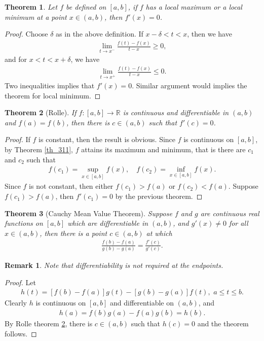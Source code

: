 \documentclass[10pt]{book}
\newtheorem{theorem}{Theorem}[chapter]
\newtheorem{remark}{Remark}[chapter]
\theoremstyle{definition}
\numberwithin{equation}{chapter}
\begin{document}
\begin{theorem}\label{th_45}
Let $f$ be defined on $[a,b]$, if $f$ has a local maximum or a local minimum at a point $x \in (a,b)$, then $f'(x) = 0$.
\end{theorem}
\begin{proof}
Choose $\delta$ as in the above definition. If $x - \delta < t < x$, then we have
\begin{align*}
    \lim_{t\to x^-}\frac{f(t) - f(x)}{t - x} \geq 0,
\end{align*}
and for $x < t < x + \delta$, we have
\begin{align*}
    \lim_{t\to x^+}\frac{f(t) - f(x)}{t - x} \leq 0.
\end{align*}
Two inequalities implies that $f'(x) = 0$. Similar argument would implies the theorem for local minimum.
\end{proof}

\medskip

\begin{theorem}[Rolle]\label{th_46}
If $f: [a,b] \to \mathbb{R}$ is continuous and differentiable in $(a,b)$ and $f(a) = f(b)$, then there is $c \in (a,b)$ such that $f'(c) = 0$.
\end{theorem}
\begin{proof}
If $f$ is constant, then the result is obvious. Since $f$ is continuous on $[a,b]$, by Theorem \ref{th_311}, $f$ attains its maximum and minimum, that is there are $c_1$ and $c_2$ such that
\begin{align*}
    f(c_1) = \sup_{x\in[a,b]} f(x), \quad f(c_2) = \inf_{x\in[a,b]} f(x).
\end{align*}
Since $f$ is not constant, then either $f(c_1) > f(a)$ or $f(c_2) < f(a)$. Suppose $f(c_1) > f(a)$, then $f'(c_1) = 0$ by the previous theorem.
\end{proof}

\medskip

\begin{theorem}[Cauchy Mean Value Theorem]\label{th_47}
Suppose $f$ and $g$ are continuous real functions on $[a,b]$ which are differentiable in $(a,b)$, and $g'(x) \neq 0$ for all $x \in (a,b)$, then there is a point $c \in (a,b)$ at which 
\begin{align*}
    \frac{f(b) - f(a)}{g(b) - g(a)} = \frac{f'(c)}{g'(c)}.
\end{align*}
\end{theorem}
\begin{remark}
Note that differentiability is not required at the endpoints.
\end{remark}
\begin{proof}
Let
\begin{align*}
    h(t) = [f(b) - f(a)]g(t) - [g(b) - g(a)]f(t), \,\, a \leq t \leq b.
\end{align*}
Clearly $h$ is continuous on $[a,b]$ and differentiable on $(a,b)$, and
\begin{align*}
    h(a) = f(b)g(a) - f(a)g(b) = h(b).
\end{align*}
By Rolle theorem \ref{th_46}, there is $c \in (a,b)$ such that $h(c) = 0$ and the theorem follows.
\end{proof}
\end{document}
